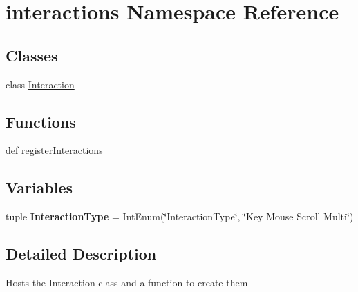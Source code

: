 \hypertarget{namespaceinteractions}{\section{interactions \-Namespace \-Reference}
\label{namespaceinteractions}
}
\subsection*{\-Classes}
\begin{DoxyCompactItemize}
\item 
class \hyperlink{classinteractions_1_1_interaction}{\-Interaction}
\end{DoxyCompactItemize}
\subsection*{\-Functions}
\begin{DoxyCompactItemize}
\item 
def \hyperlink{namespaceinteractions_a72d2fcba4dd19f5ae0fb6ae50b585209}{register\-Interactions}
\end{DoxyCompactItemize}
\subsection*{\-Variables}
\begin{DoxyCompactItemize}
\item 
\hypertarget{namespaceinteractions_aa200d6a5d7801bb314493fa0b632b051}{tuple {\bfseries \-Interaction\-Type} = \-Int\-Enum(\char`\"{}\-Interaction\-Type\char`\"{}, \char`\"{}\-Key \-Mouse \-Scroll \-Multi\char`\"{})}\label{namespaceinteractions_aa200d6a5d7801bb314493fa0b632b051}

\end{DoxyCompactItemize}


\subsection{\-Detailed \-Description}
\begin{DoxyVerb}Hosts the Interaction class and a function to create them \end{DoxyVerb}
 

